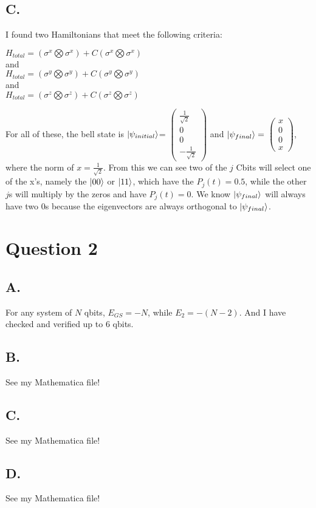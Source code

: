 \documentclass[12pt]{article}
\begin{document}
\subsection*{C.}
I found two Hamiltonians that meet the following criteria:
\begin{center}
    $H_{total} = (\sigma^x \bigotimes \sigma^x) + C (\sigma^x \bigotimes \sigma^x)$\\
    and\\
    $H_{total} = (\sigma^y \bigotimes \sigma^y) + C (\sigma^y \bigotimes \sigma^y)$\\
    and\\
    $H_{total} = (\sigma^z \bigotimes \sigma^z) + C (\sigma^z \bigotimes \sigma^z)$
\end{center}
For all of these, the bell state is $\ket{\psi_{initial}}$=
$
\begin{pmatrix} 
    \frac{1}{\sqrt{2}} \\ 0 \\ 0 \\ -\frac{1}{\sqrt{2}}
\end{pmatrix}
$
and $\ket{\psi_{final}}=$
$
\begin{pmatrix} 
    x \\ 0 \\ 0 \\ x
\end{pmatrix}
$, where the norm of $x=\frac{1}{\sqrt{2}}$.
From this we can see two of the $j$ Cbits will select one of the x's, namely the $\ket{00}$ or $\ket{11}$, which have the $P_j(t)=0.5$, while the other $j$s will multiply by the zeros and have $P_j(t)=0$.
We know $\ket{\psi_{final}}$ will always have two 0s because the eigenvectors are always orthogonal to $\ket{\psi_{final}}$.

\section*{Question 2}
\subsection*{A.}
 For any system of $N$ qbits, $E_{GS}=-N$, while $E_2=-(N-2)$.
 And I have checked and verified up to 6 qbits. 
\subsection*{B.}
See my Mathematica file!
\subsection*{C.}
See my Mathematica file!
\subsection*{D.}
See my Mathematica file!
\end{document}
